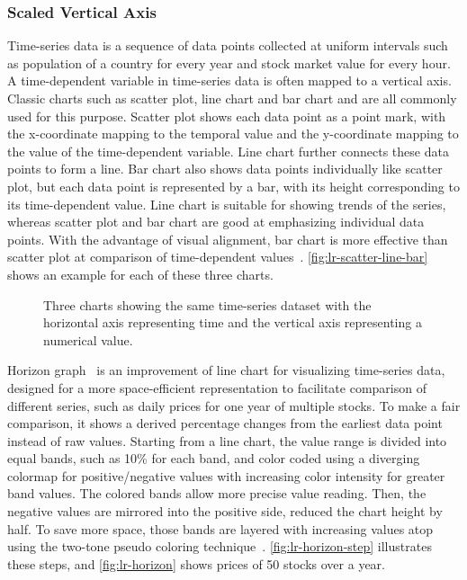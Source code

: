 \subsubsection{Scaled Vertical Axis}
Time-series data is a sequence of data points collected at uniform intervals such as population of a country for every year and stock market value for every hour. A time-dependent variable in time-series data is often mapped to a vertical axis. Classic charts such as scatter plot, line chart and bar chart and are all commonly used for this purpose. Scatter plot shows each data point as a point mark, with the x-coordinate mapping to the temporal value and the y-coordinate mapping to the value of the time-dependent variable. Line chart further connects these data points to form a line. Bar chart also shows data points individually like scatter plot, but each data point is represented by a bar, with its height corresponding to its time-dependent value. Line chart is suitable for showing trends of the series, whereas scatter plot and bar chart are good at emphasizing individual data points. With the advantage of visual alignment, bar chart is more effective than scatter plot at comparison of time-dependent values~\cite{Aigner2011}. \autoref{fig:lr-scatter-line-bar} shows an example for each of these three charts.

\begin{figure}[!htb]
\centering
{}
\hfill
{}
\hfill
{}
\caption{Three charts showing the same time-series dataset with the horizontal axis representing time and the vertical axis representing a numerical value. }
\label{fig:lr-scatter-line-bar}
\end{figure}

Horizon graph~\cite{Reijner2008} is an improvement of line chart for visualizing time-series data, designed for a more space-efficient representation to facilitate comparison of different series, such as daily prices for one year of multiple stocks. To make a fair comparison, it shows a derived percentage changes from the earliest data point instead of raw values. Starting from a line chart, the value range is divided into equal bands, such as 10\% for each band, and color coded using a diverging colormap for positive/negative values with increasing color intensity for greater band values. The colored bands allow more precise value reading. Then, the negative values are mirrored into the positive side, reduced the chart height by half. To save more space, those bands are layered with increasing values atop using the two-tone pseudo coloring technique~\cite{Saito2005}. \autoref{fig:lr-horizon-step} illustrates these steps, and \autoref{fig:lr-horizon} shows prices of 50 stocks over a year.

